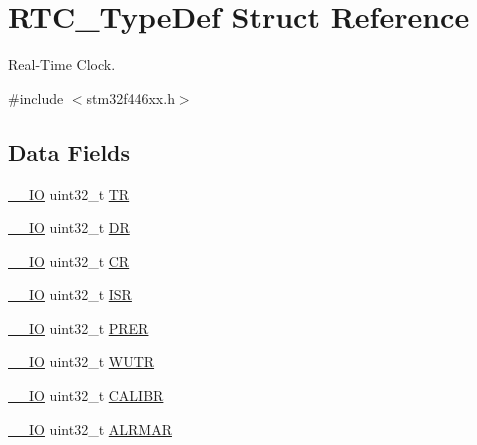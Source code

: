 \hypertarget{struct_r_t_c___type_def}{}\section{R\+T\+C\+\_\+\+Type\+Def Struct Reference}
\label{struct_r_t_c___type_def}


Real-\/\+Time Clock.  




{\ttfamily \#include $<$stm32f446xx.\+h$>$}

\subsection*{Data Fields}
\begin{DoxyCompactItemize}
\item 
\mbox{\hyperlink{core__sc300_8h_aec43007d9998a0a0e01faede4133d6be}{\+\_\+\+\_\+\+IO}} uint32\+\_\+t \mbox{\hyperlink{struct_r_t_c___type_def_a63d179b7a36a715dce7203858d3be132}{TR}}
\item 
\mbox{\hyperlink{core__sc300_8h_aec43007d9998a0a0e01faede4133d6be}{\+\_\+\+\_\+\+IO}} uint32\+\_\+t \mbox{\hyperlink{struct_r_t_c___type_def_a3df0d8dfcd1ec958659ffe21eb64fa94}{DR}}
\item 
\mbox{\hyperlink{core__sc300_8h_aec43007d9998a0a0e01faede4133d6be}{\+\_\+\+\_\+\+IO}} uint32\+\_\+t \mbox{\hyperlink{struct_r_t_c___type_def_ab40c89c59391aaa9d9a8ec011dd0907a}{CR}}
\item 
\mbox{\hyperlink{core__sc300_8h_aec43007d9998a0a0e01faede4133d6be}{\+\_\+\+\_\+\+IO}} uint32\+\_\+t \mbox{\hyperlink{struct_r_t_c___type_def_ab3c49a96815fcbee63d95e1e74f20e75}{I\+SR}}
\item 
\mbox{\hyperlink{core__sc300_8h_aec43007d9998a0a0e01faede4133d6be}{\+\_\+\+\_\+\+IO}} uint32\+\_\+t \mbox{\hyperlink{struct_r_t_c___type_def_ac9b4c6c5b29f3461ce3f875eea69f35b}{P\+R\+ER}}
\item 
\mbox{\hyperlink{core__sc300_8h_aec43007d9998a0a0e01faede4133d6be}{\+\_\+\+\_\+\+IO}} uint32\+\_\+t \mbox{\hyperlink{struct_r_t_c___type_def_ac5b3c8be61045a304d3076d4714d29f2}{W\+U\+TR}}
\item 
\mbox{\hyperlink{core__sc300_8h_aec43007d9998a0a0e01faede4133d6be}{\+\_\+\+\_\+\+IO}} uint32\+\_\+t \mbox{\hyperlink{struct_r_t_c___type_def_ab97f3e9584dda705dc10a5f4c5f6e636}{C\+A\+L\+I\+BR}}
\item 
\mbox{\hyperlink{core__sc300_8h_aec43007d9998a0a0e01faede4133d6be}{\+\_\+\+\_\+\+IO}} uint32\+\_\+t \mbox{\hyperlink{struct_r_t_c___type_def_ac005b1a5bc52634d5a34578cc9d2c3f6}{A\+L\+R\+M\+AR}}

\end{DoxyCompactItemize}
